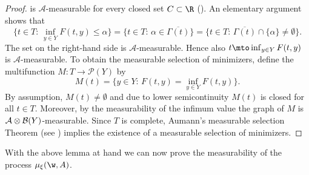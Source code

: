 \begin{proof}
is $\mathcal{A}$-measurable for every closed set $C\subset \R$ (\cf \cite[Rem.\,6.4]{FoLe}). An elementary argument shows that\vspace*{-3pt}
\begin{equation*}
\{t\in T:\, \inf_{y\in Y}F(t,y)\leq\alpha\}=\{t\in T:\,\alpha\in \overline{\Gamma(t)}\}=\{t\in T:\, \overline{\Gamma(t)}\cap \{\alpha\}\neq\emptyset\}.
\end{equation*}
The set on the right-hand side is $\mathcal{A}$-measurable. Hence also $t\mto \inf_{y\in Y}F(t,y)$ is $\mathcal{A}$-measurable. To obtain the measurable selection of minimizers, define the multifunction $M:T\to\mathcal{P}(Y)$ by\vspace*{-3pt}
\begin{equation*}
M(t)=\{y\in Y:\,F(t,y)=\inf_{y\in Y}F(t,y)\}.
\end{equation*}
By assumption, $M(t)\neq\emptyset$ and due to lower semicontinuity $M(t)$ is closed for all $t\in T$. Moreover, by the measurability of the infimum value the graph of $M$ is $\mathcal{A}\otimes\nobreak\mathcal{B}(Y)$\nobreakdash-measurable. Since $T$ is complete, Aumann's measurable selection Theorem (see \cite[Th.\,6.10]{FoLe}) implies the existence of a measurable selection of minimizers.
\end{proof}
With the above lemma at hand we can now prove the measurability of the process $\mu_{\xi}(\w,A)$.
